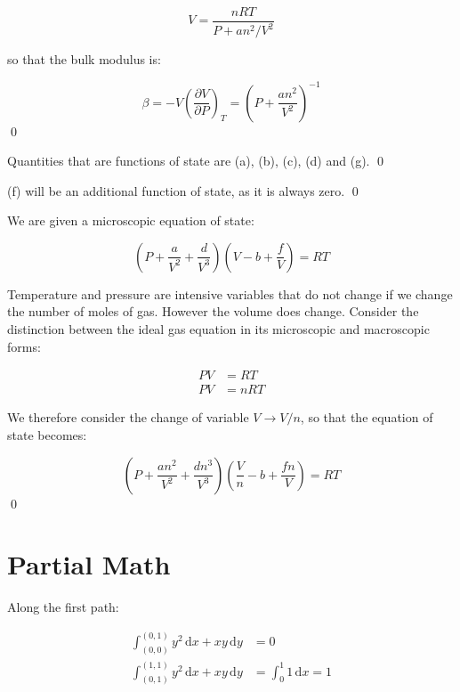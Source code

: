 \documentclass[12pt]{article}
\begin{document}
\begin{equation}
    V = \frac{nRT}{P + an^{2}/V^{2}}
\end{equation}

so that the bulk modulus is:

\begin{equation}
    \beta = -V \left( \frac{\partial V}{\partial P} \right)_{T} = \left( P + \frac{an^{2}}{V^{2}} \right)^{-1}
\end{equation}
\qed


Quantities that are functions of state are (a), (b), (c), (d) and (g).
\qed


(f) will be an additional function of state, as it is always zero.
\qed


We are given a microscopic equation of state:

\begin{equation}
    \left( P + \frac{a}{V^{2}} + \frac{d}{V^{3}} \right) \left( V - b + \frac{f}{V} \right) = RT
\end{equation}

Temperature and pressure are intensive variables that do not change if we change the number of moles of gas. However the volume does change. Consider the distinction between the ideal gas equation in its microscopic and macroscopic forms:

\begin{equation}
\begin{split}
    PV &= RT \\
    PV &= nRT
\end{split}
\end{equation}

We therefore consider the change of variable $V \to V/n$, so that the equation of state becomes:

\begin{equation}
    \left( P + \frac{an^{2}}{V^{2}} + \frac{dn^{3}}{V^{3}} \right) \left( \frac{V}{n} - b + \frac{fn}{V} \right) = RT
\end{equation}
\qed


\pagebreak
\section*{Partial Math}



Along the first path:

\begin{equation}
\begin{split}
    \int_{(0, 0)}^{(0, 1)} y^{2} \, \mathrm{d}x + xy \, \mathrm{d}y &= 0 \\
    \int_{(0, 1)}^{(1, 1)} y^{2} \, \mathrm{d}x + xy \, \mathrm{d}y &= \int_{0}^{1} 1 \, \mathrm{d}x = 1
\end{split}
\end{equation}
\end{document}

